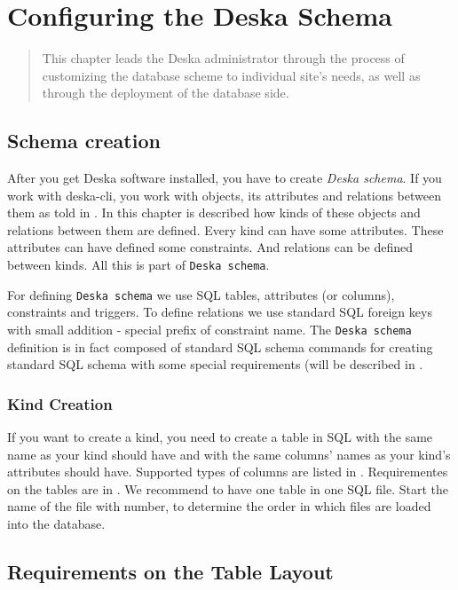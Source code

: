 \documentclass[deska]{subfiles}
\begin{document}
\chapter{Configuring the Deska Schema}
\label{sec:admin-dbscheme}

\begin{abstract}
This chapter leads the Deska administrator through the process of customizing the database scheme to individual site's
needs, as well as through the deployment of the database side.
\end{abstract}

\section{Schema creation}
After  you get Deska software installed, you have to create {\em Deska schema}. If you work with
deska-cli, you work with objects, its attributes and relations between them as told in .
In this chapter is described how kinds of these objects and relations between them are defined. Every kind can have some attributes. These attributes can have defined some constraints. And relations can be defined between kinds.
All this is part of {\tt Deska schema}.

For defining {\tt Deska schema} we use SQL tables, attributes (or columns), constraints and triggers.
To define relations we use standard SQL foreign keys with small addition - special prefix of constraint name.
The {\tt Deska schema} definition is in fact composed of standard SQL schema commands for creating standard SQL schema with some
special requirements (will be described in .

\subsection{Kind Creation}
If you want to create a kind, you need to create a table in SQL with the same name as your kind should have and with the same columns' names as your kind's attributes should have. Supported types of columns are listed in . Requirementes on the tables are in .
We recommend to have one table in one SQL file. Start the name of the file with number,
to determine the order in which files are loaded into the database.

\section{Requirements on the Table Layout}
\label{sec:db-scheme-req}
\end{document}
